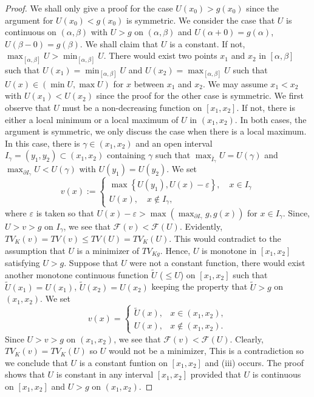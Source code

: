 \documentclass[10pt,a4paper]{amsart}
\begin{document}
\begin{proof}
We shall only give a proof for the case $U(x_0)>g(x_0)$ since the argument for $U(x_0)<g(x_0)$ is symmetric.
 We consider the case that $U$ is continuous on $(\alpha,\beta)$ with $U>g$ on $(\alpha,\beta)$ and $U(\alpha+0)=g(\alpha)$, $U(\beta-0)=g(\beta)$.
 We shall claim that $U$ is a constant.
 If not, $\max_{[\alpha,\beta]}U>\min_{[\alpha,\beta]}U$.
 There would exist two points $x_1$ and $x_2$ in $[\alpha,\beta]$ such that $U(x_1)=\min_{[\alpha,\beta]}U$ and $U(x_2)=\max_{[\alpha,\beta]}U$ such that $U(x)\in(\min U,\max U)$ for $x$ between $x_1$ and $x_2$.
 We may assume $x_1<x_2$ with $U(x_1)<U(x_2)$ since the proof for the other case is symmetric.
 We first observe that $U$ must be a non-decreasing function on $[x_1,x_2]$.
 If not, there is either a local minimum or a local maximum of $U$ in $(x_1, x_2)$.
 In both cases, the argument is symmetric, we only discuss the case when there is a local maximum.
 In this case, there is $\gamma\in(x_1,x_2)$ and an open interval $I_\gamma=(y_1,y_2)\subset(x_1,x_2)$ containing $\gamma$ such that $\max_{\bar{I}_\gamma}U=U(\gamma)$ and $\max_{\partial I_\gamma}U<U(\gamma)$ with $U(y_1)=U(y_2)$.
 We set
\[
	v(x) := \left\{
\begin{array}{l}
	\max \left\{ U(y_1), U(x) - \varepsilon \right\}, \quad x \in I_\gamma \\
	U(x), \quad x \notin I_\gamma,
\end{array}
\right.
\]
where $\varepsilon$ is taken so that $U(x)-\varepsilon>\max\left(\max_{\partial I_\gamma}g, g(x)\right)$ for $x\in I_\gamma$.
 Since, $U>v>g$ on $I_\gamma$, we see that $\mathcal{F}(v)<\mathcal{F}(U)$.
 Evidently, $TV_K(v)=TV(v)\leq TV(U)=TV_K(U)$.
 This would contradict to the assumption that $U$ is a minimizer of $TV_{Kg}$.
 Hence, $U$ is monotone in $[x_1,x_2]$ satisfying $U>g$.
 Suppose that $U$ were not a constant function, there would exist another monotone continuous function $\tilde{U}$ ($\le U$) on $[x_1,x_2]$ such that $\tilde{U}(x_1)=U(x_1)$, $\tilde{U}(x_2)=U(x_2)$ keeping the property that $\tilde{U}>g$ on $(x_1,x_2)$.
 We set
\[
	v(x) = \left\{
\begin{array}{ll}
	\tilde{U}(x), & x \in (x_1, x_2), \\
	U(x), & x \notin (x_1, x_2).
\end{array}
\right.
\]
Since $U>v>g$ on $(x_1,x_2)$, we see that $\mathcal{F}(v)<\mathcal{F}(U)$.
 Clearly, $TV_K(v)=TV_K(U)$ so $U$ would not be a minimizer,
 This is a contradiction so we conclude that $U$ is a constant funtion on $[x_1,x_2]$ and (i\hspace{-1pt}i\hspace{-1pt}i) occurs.
 The proof shows that $U$ is constant in any interval $[x_1,x_2]$ provided that $U$ is continuous on $[x_1,x_2]$ and $U>g$ on $(x_1,x_2)$.


\end{proof}
\end{document}
